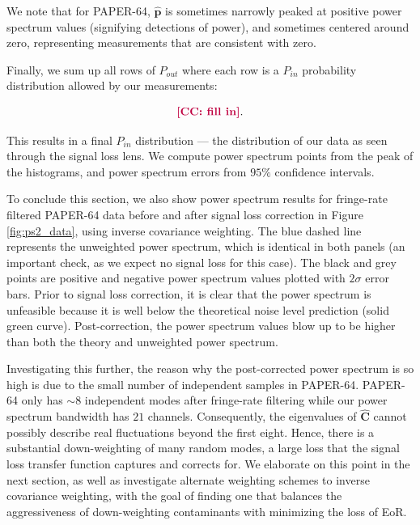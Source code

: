 \documentclass[preprint2,numberedappendix,tighten]{aastex6}  %
\newcommand{\cc}[1]{{\color{purple} \textbf{[CC: #1]}}}
\begin{document}
We note that for PAPER-64, $\hat{\textbf{p}}$ is sometimes narrowly peaked at positive power spectrum values (signifying detections of power), and sometimes centered around zero, representing measurements that are consistent with zero.

Finally, we sum up all rows of $P_{out}$ where each row is a $P_{in}$ probability distribution allowed by our measurements:

\begin{equation}
\cc{fill in}.
\end{equation}

This results in a final $P_{in}$ distribution --- the distribution of our data as seen through the signal loss lens. We compute power spectrum points from the peak of the histograms, and power spectrum errors from $95\%$ confidence intervals. 


To conclude this section, we also show power spectrum results for fringe-rate filtered PAPER-64 data before and after signal loss correction in Figure \ref{fig:ps2_data}, using inverse covariance weighting. The blue dashed line represents the unweighted power spectrum, which is identical in both panels (an important check, as we expect no signal loss for this case). The black and grey points are positive and negative power spectrum values plotted with $2\sigma$ error bars. Prior to signal loss correction, it is clear that the power spectrum is unfeasible because it is well below the theoretical noise level prediction (solid green curve). Post-correction, the power spectrum values blow up to be higher than both the theory and unweighted power spectrum. 

Investigating this further, the reason why the post-corrected power spectrum is so high is due to the small number of independent samples in PAPER-64. PAPER-64 only has $\sim$$8$ independent modes after fringe-rate filtering while our power spectrum bandwidth has $21$ channels. Consequently, the eigenvalues of $\hat{\textbf{C}}$ cannot possibly describe real fluctuations beyond the first eight. Hence, there is a substantial down-weighting of many random modes, a large loss that the signal loss transfer function captures and corrects for. We elaborate on this point in the next section, as well as investigate alternate weighting schemes to inverse covariance weighting, with the goal of finding one that balances the aggressiveness of down-weighting contaminants with minimizing the loss of EoR. 
\end{document}
